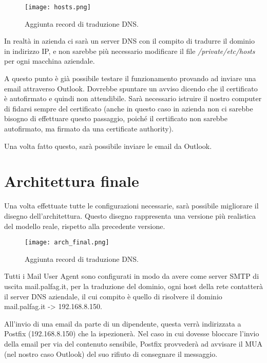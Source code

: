     \begin{figure}[htp]
        \centering
        \texttt{[image: hosts.png]}
        \caption{Aggiunta record di traduzione DNS.}\label{hosts}
    \end{figure}  

    In realtà in azienda ci sarà un server DNS con il compito di tradurre il dominio in indirizzo IP, 
    e non sarebbe più necessario modificare il file \textit{/private/etc/hosts} per ogni macchina aziendale.


    A questo punto è già possibile testare il funzionamento provando ad inviare una email attraverso Outlook. 
    Dovrebbe spuntare un avviso dicendo che il certificato è autofirmato e quindi non attendibile. 
    Sarà necessario istruire il nostro computer di fidarsi sempre del certificato
    (anche in questo caso in azienda non ci sarebbe bisogno di effettuare questo passaggio, poiché 
    il certificato non sarebbe autofirmato, ma firmato da una certificate authority).

    Una volta fatto questo, sarà possibile inviare le email da Outlook.


    \section{Architettura finale}
    Una volta effettuate tutte le configurazioni necessarie, sarà possibile migliorare il disegno dell’architettura. 
    Questo disegno rappresenta una versione più realistica del modello reale, rispetto alla precedente versione.

    \begin{figure}[htp]
        \centering
        \texttt{[image: arch\_final.png]}
        \caption{Aggiunta record di traduzione DNS.}\label{hosts}
    \end{figure} 

    Tutti i Mail User Agent sono configurati in modo da avere come server SMTP di uscita mail.palfag.it, 
    per la traduzione del dominio, ogni host della rete contatterà il server DNS aziendale, il cui compito è
    quello di risolvere il dominio mail.palfag.it -> 192.168.8.150.

    All'invio di una email da parte di un dipendente, questa verrà indirizzata a Postfix (192.168.8.150) che la 
    ispezionerà. Nel caso in cui dovesse bloccare l’invio della email per via del contenuto sensibile, 
    Postfix provvederà ad avvisare il MUA (nel nostro caso Outlook) del suo rifiuto di consegnare il messaggio.

